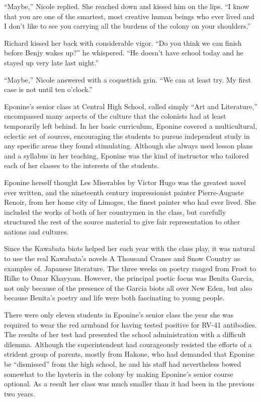 \documentclass[]{article}
\begin{document}
{“Maybe,” Nicole replied.  She reached down and kissed him on the lips.  “I know that you are one of the smartest, most creative human beings who ever lived and I don’t like to see you carrying all the burdens of the colony on your shoulders.”

Richard kissed her back with considerable vigor.  “Do you think we can finish before Benjy wakes up?” he whispered.  “He doesn’t have school today and he stayed up very late last night.”

“Maybe,” Nicole answered with a coquettish grin.  “We can at least try.  My first case is not until ten o’clock.”

Eponine’s senior class at Central High School, called simply “Art and Literature,” encompassed many aspects of the culture that the colonists had at least temporarily left behind.  In her basic curriculum, Eponine covered a multicultural, eclectic set of sources, encouraging the students to pursue independent study in any specific areas they found stimulating.  Although she always used lesson plans and a syllabus in her teaching, Eponine was the kind of instructor who tailored each of her classes to the interests of the students.

Eponine herself thought Les Miserables by Victor Hugo was the greatest novel ever written, and the nineteenth century impressionist painter Pierre-Auguste Renoir, from her home city of Limoges, the finest painter who had ever lived.  She included the works of both of her countrymen in the class, but carefully structured the rest of the source material to give fair representation to other nations and cultures.

Since the Kawabata biots helped her each year with the class play, it was natural to use the real Kawabata’s novels A Thousand Cranes and Snow Country as examples of.  Japanese literature.  The three weeks on poetry ranged from Frost to Rilke to Omar Khayyam.  However, the principal poetic focus was Benita Garcia, not only because of the presence of the Garcia biots all over New Eden, but also because Benita’s poetry and life were both fascinating to young people.

There were only eleven students in Eponine’s senior class the year she was required to wear the red armband for having tested positive for RV-41 antibodies.  The results of her test had presented the school administration with a difficult dilemma.  Although the superintendent had courageously resisted the efforts of a strident group of parents, mostly from Hakone, who had demanded that Eponine be “dismissed” from the high school, he and his staff had nevertheless bowed somewhat to the hysteria in the colony by making Eponine’s senior course optional.  As a result her class was much smaller than it had been in the previous two years.

}
\end{document}
